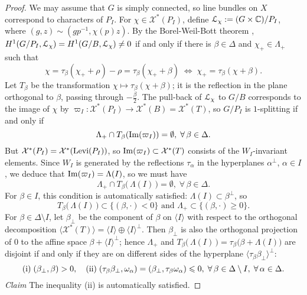 \documentclass[11pt,reqno]{amsart}
\let\mt\mapsto
\let\euf\EuScript
\let\cal\mathcal
\let\mbb\mathbb
\let\nit\noindent
\let\lan\langle
\let\ran\rangle
\numberwithin{equation}{section}
\numberwithin{figure}{section}
\let\L\Lambda
\let\sm\setminus
\let\ges\geqslant
\let\les\leqslant
\begin{document}
\begin{proof}
We may assume that $G$ is simply connected, so line bundles on $X$ correspond 
to characters of $P_I$. For $\chi\in\cal X^*(P_I)$, define 
${{\euf L}}_\chi:=(G\times\mbb C)/P_I$, where $(g,z)\sim(gp^{-1},\chi(p)z)$. 
By the Borel-Weil-Bott theorem \cite{bott-homog,demazure}, 
$H^1(G/P_I,{{\euf L}}_\chi)= H^1(G/B,{{\euf L}}_\chi)\neq 0$ if and only if 
there is $\beta\in\Delta$ and $\chi_+\in\L_+$ such that 
$$\chi=\tau_\beta(\chi_++\rho)-\rho=\tau_\beta(\chi_++\beta)
\;\Leftrightarrow\;
\chi_+=\tau_\beta(\chi+\beta).$$
Let $T_\beta$ be the transformation $\chi\mt \tau_\beta(\chi+\beta)$; 
it is the reflection in the plane orthogonal to $\beta$, passing through $-\frac{\beta}{2}$.
The pull-back of ${{\euf L}}_\chi$ to $G/B$ corresponds to the image of $\chi$ by 
$\varpi_I:\cal X^*(P_I)\to\cal X^*(B)=\cal X^*(T)$, 
so $G/P_I$ is $1$-splitting if and only if 
$$\L_+\cap T_\beta({{\rm Im}}(\varpi_I))=\emptyset,\;\forall\,\beta\in\Delta.$$
But $\cal X^*(P_I)=\cal X^*({\mathop{\rm Levi}\nolimits}(P_I))$, so ${{\rm Im}}(\varpi_I)\subset\cal X^*(T)$ 
consists of the $W_I$-invariant elements. Since $W_I$ is generated by the reflections 
$\tau_\alpha$ in the hyperplanes $\alpha^\perp$, $\alpha\in I$, we deduce that 
${{\rm Im}}(\varpi_I)=\L(I)$, so we must have 
$$\L_+\cap T_\beta\big(\,\L(I)\,\big)=\emptyset,\;\forall\,\beta\in\Delta.$$
For $\beta\in I$, this condition is automatically satisfied: 
$\L(I)\subset\beta^\perp$, so 
$$T_\beta\big(\,\L(I)\,\big)\subset\{(\beta,\cdot)<0\}
\text{ and  }
\L_+\subset\{(\beta,\cdot)\ges0\}.$$ 
For $\beta\in\Delta\sm I$, let $\beta_{\perp}$ be the component of $\beta$ 
on ${{\lan {I}\ran}}$ with respect to the orthogonal decomposition 
${{\lan {\cal X^*(T)}\ran}}={{\lan {I}\ran}}\oplus{{\lan {I}\ran}}^\perp$.  Then $\beta_{\perp}$ is also the 
orthogonal projection of $0$ to the affine space $\beta+{{\lan {I}\ran}}^\perp$; hence $\L_+$ 
and $T_\beta\big(\,\L(I)\,\big)=\tau_\beta\big(\beta+\L(I)\big)$ 
are disjoint if and only if they are on different sides of the hyperplane 
${{\lan {\tau_\beta\beta_\perp}\ran}}^\perp$: 
\begin{equation}\label{eq:gp-split}
{\rm(i)}\;(\beta_\perp,\beta)>0,
\quad{\rm(ii)}\;(\tau_\beta\beta_\perp,\omega_\alpha)
=(\beta_\perp,\tau_\beta\omega_\alpha)\les0,
\;\forall\,\beta\in\Delta\sm I,\;\forall\,\alpha\in\Delta.
\end{equation} 
\nit\textit{Claim} The inequality (ii) is automatically satisfied. 


\end{proof}
\end{document}
